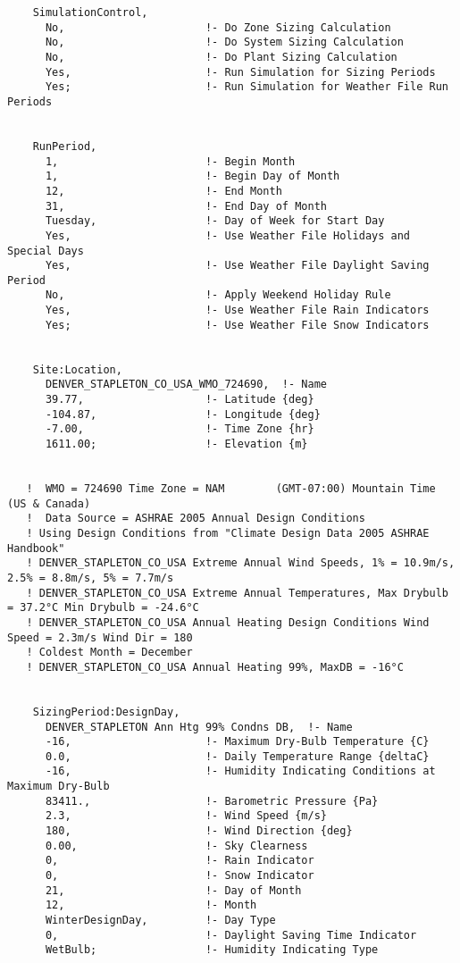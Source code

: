 \begin{lstlisting}
    SimulationControl,
      No,                      !- Do Zone Sizing Calculation
      No,                      !- Do System Sizing Calculation
      No,                      !- Do Plant Sizing Calculation
      Yes,                     !- Run Simulation for Sizing Periods
      Yes;                     !- Run Simulation for Weather File Run Periods


    RunPeriod,
      1,                       !- Begin Month
      1,                       !- Begin Day of Month
      12,                      !- End Month
      31,                      !- End Day of Month
      Tuesday,                 !- Day of Week for Start Day
      Yes,                     !- Use Weather File Holidays and Special Days
      Yes,                     !- Use Weather File Daylight Saving Period
      No,                      !- Apply Weekend Holiday Rule
      Yes,                     !- Use Weather File Rain Indicators
      Yes;                     !- Use Weather File Snow Indicators


    Site:Location,
      DENVER_STAPLETON_CO_USA_WMO_724690,  !- Name
      39.77,                   !- Latitude {deg}
      -104.87,                 !- Longitude {deg}
      -7.00,                   !- Time Zone {hr}
      1611.00;                 !- Elevation {m}


   !  WMO = 724690 Time Zone = NAM        (GMT-07:00) Mountain Time (US & Canada)
   !  Data Source = ASHRAE 2005 Annual Design Conditions
   ! Using Design Conditions from "Climate Design Data 2005 ASHRAE Handbook"
   ! DENVER_STAPLETON_CO_USA Extreme Annual Wind Speeds, 1% = 10.9m/s, 2.5% = 8.8m/s, 5% = 7.7m/s
   ! DENVER_STAPLETON_CO_USA Extreme Annual Temperatures, Max Drybulb = 37.2°C Min Drybulb = -24.6°C
   ! DENVER_STAPLETON_CO_USA Annual Heating Design Conditions Wind Speed = 2.3m/s Wind Dir = 180
   ! Coldest Month = December
   ! DENVER_STAPLETON_CO_USA Annual Heating 99%, MaxDB = -16°C


    SizingPeriod:DesignDay,
      DENVER_STAPLETON Ann Htg 99% Condns DB,  !- Name
      -16,                     !- Maximum Dry-Bulb Temperature {C}
      0.0,                     !- Daily Temperature Range {deltaC}
      -16,                     !- Humidity Indicating Conditions at Maximum Dry-Bulb
      83411.,                  !- Barometric Pressure {Pa}
      2.3,                     !- Wind Speed {m/s}
      180,                     !- Wind Direction {deg}
      0.00,                    !- Sky Clearness
      0,                       !- Rain Indicator
      0,                       !- Snow Indicator
      21,                      !- Day of Month
      12,                      !- Month
      WinterDesignDay,         !- Day Type
      0,                       !- Daylight Saving Time Indicator
      WetBulb;                 !- Humidity Indicating Type



\end{lstlisting}
